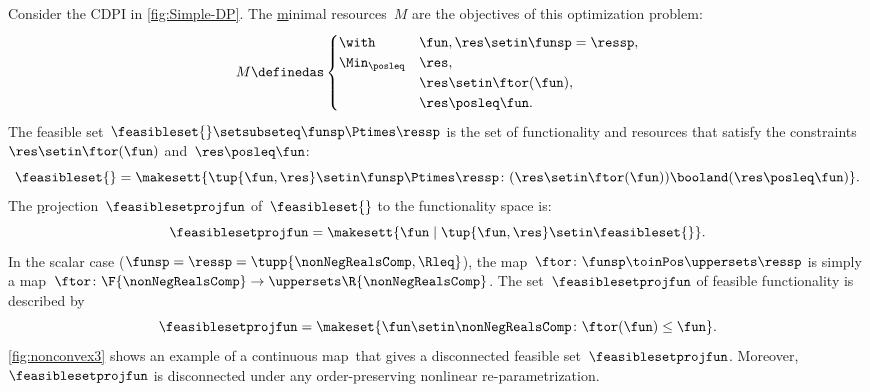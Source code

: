 \begin{example}
    \label{exa:one}
    Consider the CDPI in \cref{fig:Simple-DP}.
    The \uline{m}inimal resources~$M$ are the objectives of this optimization problem:
    \begin{equation}
        M\definedas
        \begin{cases}
            \with          & \fun,\res\setin\funsp=\ressp, \\
            \Min_{\posleq} & \res,                         \\
                           & \res\setin\ftor(\fun),        \\
                           & \res\posleq\fun.
        \end{cases}
    \end{equation}
    The feasible set~$\feasibleset{}\setsubseteq\funsp\Ptimes \ressp$ is the set of functionality and resources that satisfy the constraints~$\res\setin\ftor(\fun)$ and~$\res\posleq\fun$:
    \begin{equation}
        \feasibleset{}=\makesett{ \tup{\fun,\res}\setin\funsp\Ptimes \ressp\colon (\res\setin\ftor(\fun))\booland(\res\posleq\fun)} .
        \label{eq:feasible}
    \end{equation}
    The \uline{p}rojection~$\feasiblesetprojfun$ of~$\feasibleset{}$ to the functionality space is:
    \begin{equation}
        \feasiblesetprojfun=\makesett{ \fun\mid\tup{\fun,\res} \setin\feasibleset{}}.
    \end{equation}
    In the scalar case ($\funsp=\ressp=\tupp{\nonNegRealsComp,{{\Rleq}}}$), the map~$\ftor\colon\funsp\toinPos\uppersets \ressp$ is simply a map~$\ftor\colon\F{\nonNegRealsComp}\to \uppersets\R{\nonNegRealsComp}$.
    The set~$\feasiblesetprojfun$ of feasible functionality is described by
    \begin{equation}
        \feasiblesetprojfun=\makeset{\fun\setin\nonNegRealsComp\colon \ftor(\fun)\leq\fun}.
        \label{eq:Pfeasible}
    \end{equation}
    \cref{fig:nonconvex3} shows an example of a continuous map~\ftor that gives a disconnected feasible set~$\feasiblesetprojfun$.
    Moreover,~$\feasiblesetprojfun$ is disconnected under any order-preserving nonlinear re-parametrization.

\end{example}

